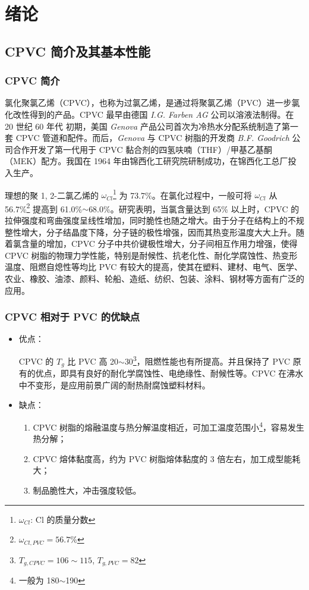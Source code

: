 \chapter{绪论}

\section{CPVC 简介及其基本性能}

\subsection{CPVC 简介}
氯化聚氯乙烯（CPVC），也称为过氯乙烯，是通过将聚氯乙烯（PVC）进一步氯化改性得到的产品。CPVC 最早由德国 \textit{I.G. Farben AG} 公司以溶液法制得。在 20 世纪 60 年代 初期，美国 \textit{Genova} 产品公司首次为冷热水分配系统制造了第一套 CPVC 管道和配件。而后，\textit{Genova} 与 CPVC 树脂的开发商 \textit{B.F. Goodrich} 公司合作开发了第一代用于 CPVC 黏合剂的四氢呋喃（THF）/甲基乙基酮（MEK）配方。我国在 1964 年由锦西化工研究院研制成功，在锦西化工总厂投入生产。\par
理想的聚 1, 2-二氯乙烯的 $\omega_{Cl}$\footnote{$\omega_{Cl}$: Cl 的质量分数} 为 73.7\%。在氯化过程中，一般可将 $\omega_{Cl}$ 从 56.7\%\footnote{$\omega_{Cl, PVC} = 56.7\%$} 提高到 61.0\%$\sim$68.0\%。研究表明，当氯含量达到 65\% 以上时，CPVC 的拉伸强度和弯曲强度呈线性增加，同时脆性也随之增大。由于分子在结构上的不规整性增大，分子结晶度下降，分子链的极性增强，因而其热变形温度大大上升\cite{14}。随着氯含量的增加，CPVC 分子中共价键极性增大，分子间相互作用力增强，使得 CPVC 树脂的物理力学性能，特别是耐候性、抗老化性、耐化学腐蚀性、热变形温度、阻燃自熄性等均比 PVC 有较大的提高，使其在塑料、建材、电气、医学、农业、橡胶、油漆、颜料、轮船、造纸、纺织、包装、涂料、钢材等方面有广泛的应用\cite{19}。

\subsection{CPVC 相对于 PVC 的优缺点}
\begin{itemize}
    \item{
        优点：\par
        CPVC 的 $T_g$ 比 PVC 高 20$\sim$30\cd\footnote{$T_{g, CPVC} = 106\sim 115$\cd, $T_{g, PVC} = 82$\cd}，阻燃性能也有所提高。并且保持了 PVC 原有的优点，即具有良好的耐化学腐蚀性、电绝缘性、耐候性等。CPVC 在沸水中不变形，是应用前景广阔的耐热耐腐蚀塑料材料。
    }
    \item{
        缺点：\par
        \begin{enumerate}[(1) ]
            \item CPVC 树脂的熔融温度与热分解温度相近，可加工温度范围小\footnote{一般为 180$\sim$190\cd}，容易发生热分解；
            \item CPVC 熔体黏度高，约为 PVC 树脂熔体黏度的 3 倍左右，加工成型能耗大；
            \item 制品脆性大，冲击强度较低。
        \end{enumerate}
    }
\end{itemize}

